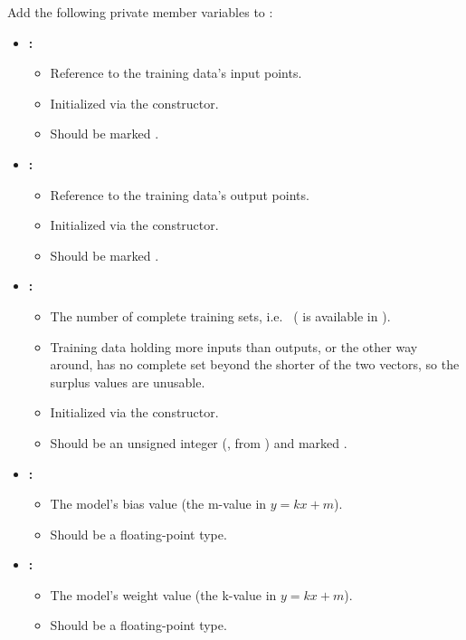\label{c1:ex:9}
Add the following private member variables to :
\begin{itemize}
  \item \textbf{:}
  \begin{itemize}
    \item Reference to the training data's input points.
    \item Initialized via the constructor.
    \item Should be marked .
  \end{itemize}
  \item \textbf{:}
  \begin{itemize}
    \item Reference to the training data's output points.
    \item Initialized via the constructor.
    \item Should be marked .
  \end{itemize}
  \item \textbf{:}
  \begin{itemize}
    \item The number of complete training sets, i.e.\
       ( is available in
      \code{<algorithm>}).
    \item Training data holding more inputs than outputs, or the other way around, has no complete
      set beyond the shorter of the two vectors, so the surplus values are unusable.
    \item Initialized via the constructor.
    \item Should be an unsigned integer (, from ) and marked
      \code{const}.
  \end{itemize}
  \item \textbf{:}
  \begin{itemize}
    \item The model's bias value (the m-value in $y = kx + m$).
    \item Should be a floating-point type.
  \end{itemize}
  \item \textbf{:}
  \begin{itemize}
    \item The model's weight value (the k-value in $y = kx + m$).
    \item Should be a floating-point type.
  \end{itemize}
\end{itemize}

